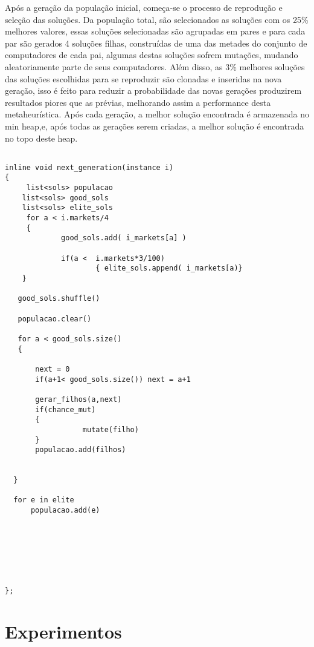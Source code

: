 \documentclass[12pt]{article}
\begin{document}
Após a geração da população inicial, começa-se o processo de reprodução e seleção das soluções. Da população total, são selecionados as soluções com os 25\% melhores valores, essas soluções selecionadas são agrupadas em pares e para cada par são gerados 4 soluções filhas, construídas de uma das metades do conjunto de computadores de cada pai, algumas destas soluções sofrem mutações, mudando aleatoriamente parte de seus computadores. Além disso, as 3\% melhores soluções das soluções escolhidas para se reproduzir são clonadas e inseridas na nova geração, isso é feito para reduzir a probabilidade das novas gerações produzirem resultados piores que as prévias, melhorando assim a performance desta metaheurística. Após cada geração, a melhor solução encontrada é armazenada no min heap,e, após todas as gerações serem criadas, a melhor solução é encontrada no topo deste heap.


\begin{lstlisting}

inline void next_generation(instance i)
{
     list<sols> populacao
    list<sols> good_sols
    list<sols> elite_sols
     for a < i.markets/4
     { 
             good_sols.add( i_markets[a] )
             
             if(a <  i.markets*3/100) 
                     { elite_sols.append( i_markets[a)}
    }

   good_sols.shuffle()

   populacao.clear()

   for a < good_sols.size()
   {

       next = 0
       if(a+1< good_sols.size()) next = a+1
        
       gerar_filhos(a,next)
       if(chance_mut)
       {
                  mutate(filho)
       }
       populacao.add(filhos)


  }

  for e in elite
      populacao.add(e)

    
       
    



};
\end{lstlisting}
\begingroup
{}
\endgroup








\section{Experimentos}
\end{document}
